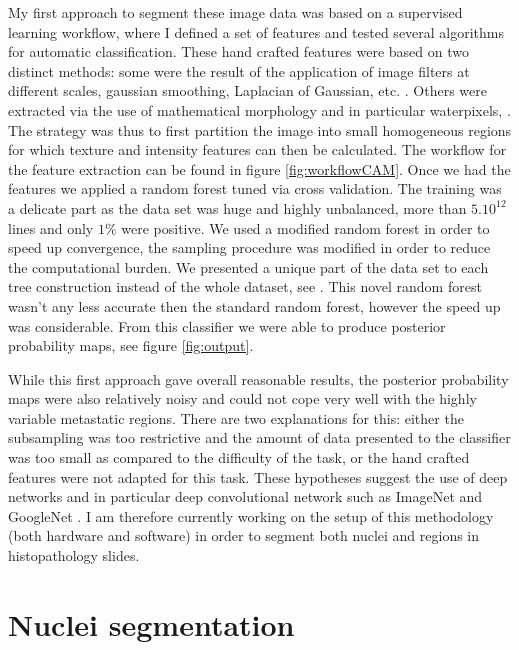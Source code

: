 \documentclass[a4paper,10pt,twocolumn]{article}
\begin{document}
My first approach to segment these image data was based on a
supervised learning workflow, where I defined a set of features
and tested several algorithms for automatic classification. 
These hand crafted features were based on two distinct methods: some
were the result of the
application of image filters at different scales, gaussian smoothing,
Laplacian of Gaussian, etc. \citep{Ilastik}. Others were extracted via the use of
mathematical morphology and in particular  waterpixels,
\citep{waterpixels}. The strategy was thus to first partition the
image into small homogeneous regions for which texture and intensity
features can then be calculated. 
The workflow for the feature extraction can be
found in figure \ref{fig:workflowCAM}. Once we had the features we
applied a random forest tuned via cross validation. The training was a
delicate part as the data set was huge and highly unbalanced, more
than $5 . 10^{12}$ lines and only $1\%$ were positive. We used a
modified random forest in order to speed up convergence, the sampling
procedure was modified in order to reduce the computational burden. We
presented a unique part of the data set to each tree construction
instead of the whole dataset, see \citep{breiman}. This novel random
forest wasn't any less accurate then the standard random forest,
however the speed up was considerable. From this classifier we were
able to produce posterior probability maps, see figure \ref{fig:output}.  

While this first approach gave overall reasonable results, the
posterior probability maps were also relatively noisy and could not
cope very well with the highly variable metastatic regions. There are
two explanations for this: either the subsampling was too restrictive
and the amount of data presented to the classifier was too small as
compared to the difficulty of the task, or the hand crafted features
were not adapted for this task. These hypotheses suggest the use of
deep networks and in
particular deep convolutional network such as ImageNet \citep{ImageNet}
and GoogleNet \citep{szegedy2015going}. I am therefore currently
working on the setup of this methodology (both hardware and software)
in order to segment both nuclei and regions in histopathology slides. 


\section{Nuclei segmentation}
\end{document}
